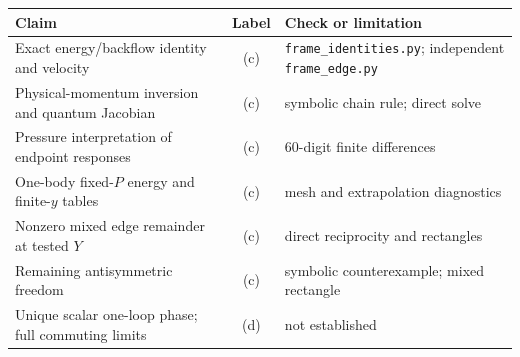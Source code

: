 \documentclass[11pt,a4paper]{article}
\newcommand{\id}{\texttt{frame\_\allowbreak identities.py}}
\newcommand{\ed}{\texttt{frame\_\allowbreak edge.py}}
\begin{document}
\begin{center}\small
\begin{tabular}{p{.48\linewidth}cp{.35\linewidth}}
\toprule Claim & Label & Check or limitation\\\midrule
Exact energy/backflow identity and velocity & (c) & \id; independent \ed\\
Physical-momentum inversion and quantum Jacobian & (c) & symbolic chain rule; direct solve\\
Pressure interpretation of endpoint responses & (c) & 60-digit finite differences\\
One-body fixed-$P$ energy and finite-$y$ tables & (c) & mesh and extrapolation diagnostics\\
Nonzero mixed edge remainder at tested $Y$ & (c) & direct reciprocity and rectangles\\
Remaining antisymmetric freedom & (c) & symbolic counterexample; mixed rectangle\\
Unique scalar one-loop phase; full commuting limits & (d) & not established\\
\bottomrule
\end{tabular}
\end{center}
\end{document}
